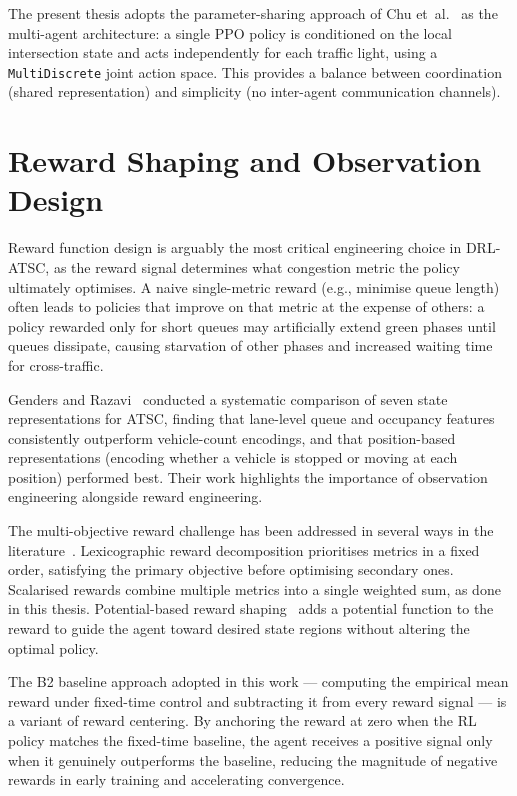 \documentclass[12pt,oneside,a4paper]{report}
\newcommand{\ppo}{\textsc{PPO}}
\begin{document}
The present thesis adopts the parameter-sharing approach of
Chu et~al.~\cite{chu2020marl} as the multi-agent architecture:
a single \ppo{} policy is conditioned on the local intersection
state and acts independently for each traffic light, using a
\texttt{MultiDiscrete} joint action space.  This provides a
balance between coordination (shared representation) and
simplicity (no inter-agent communication channels).

\section{Reward Shaping and Observation Design}
\label{sec:lit_reward}

Reward function design is arguably the most critical engineering
choice in DRL-ATSC, as the reward signal determines what congestion
metric the policy ultimately optimises.  A naive single-metric
reward (e.g., minimise queue length) often leads to policies that
improve on that metric at the expense of others: a policy rewarded
only for short queues may artificially extend green phases until
queues dissipate, causing starvation of other phases and increased
waiting time for cross-traffic.

Genders and Razavi~\cite{genders2018} conducted a systematic
comparison of seven state representations for ATSC, finding that
lane-level queue and occupancy features consistently outperform
vehicle-count encodings, and that position-based representations
(encoding whether a vehicle is stopped or moving at each position)
performed best.  Their work highlights the importance of observation
engineering alongside reward engineering.

The multi-objective reward challenge has been addressed in several
ways in the literature~\cite{morl2022}.  Lexicographic reward
decomposition prioritises metrics in a fixed order, satisfying the
primary objective before optimising secondary ones.  Scalarised rewards
combine multiple metrics into a single weighted sum, as done in this
thesis.  Potential-based reward shaping~\cite{rewshaping1999,sutton_barto2018}
adds a potential function to the reward to guide the agent toward
desired state regions without altering the optimal policy.

The B2 baseline approach adopted in this work --- computing the
empirical mean reward under fixed-time control and subtracting it
from every reward signal --- is a variant of reward centering.
By anchoring the reward at zero when the RL policy matches the
fixed-time baseline, the agent receives a positive signal only when
it genuinely outperforms the baseline, reducing the magnitude of
negative rewards in early training and accelerating convergence.
\end{document}
